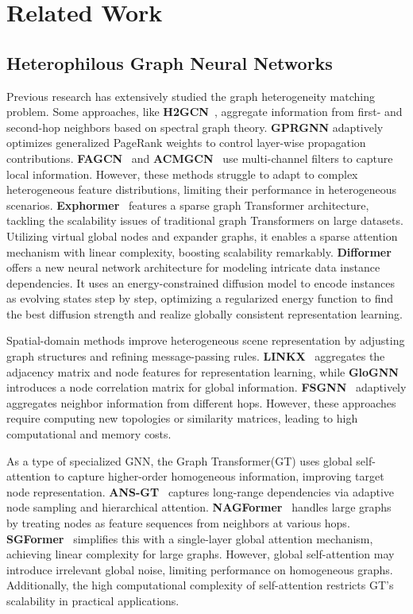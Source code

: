 \section{Related Work}
\subsection{Heterophilous Graph Neural Networks}  
Previous research has extensively studied the graph heterogeneity matching problem. Some approaches, like \textbf{H2GCN}~\cite{H2GCN2020}, aggregate information from first- and second-hop neighbors based on spectral graph theory. \textbf{GPRGNN} adaptively optimizes generalized PageRank weights to control layer-wise propagation contributions. \textbf{FAGCN}~\cite{fagcn2021} and \textbf{ACMGCN}~\cite{luan2022revisiting} use multi-channel filters to capture local information. However, these methods struggle to adapt to complex heterogeneous feature distributions, limiting their performance in heterogeneous scenarios. \textbf{Exphormer}~\cite{exphormer} features a sparse graph Transformer architecture, tackling the scalability issues of traditional graph Transformers on large datasets.  Utilizing virtual global nodes and expander graphs, it enables a sparse attention mechanism with linear complexity, boosting scalability remarkably.
\textbf{Difformer}~\cite{wu2023difformer} offers a new neural network architecture for modeling intricate data instance dependencies.  It uses an energy-constrained diffusion model to encode instances as evolving states step by step, optimizing a regularized energy function to find the best diffusion strength and realize globally consistent representation learning.

Spatial-domain methods improve heterogeneous scene representation by adjusting graph structures and refining message-passing rules. \textbf{LINKX}~\cite{NEURIPS2021_ae816a80} aggregates the adjacency matrix and node features for representation learning, while \textbf{GloGNN}~\cite{li2022finding} introduces a node correlation matrix for global information. \textbf{FSGNN}~\cite{MAURYA2022101695} adaptively aggregates neighbor information from different hops. However, these approaches require computing new topologies or similarity matrices, leading to high computational and memory costs. 

As a type of specialized GNN, the Graph Transformer(GT) uses global self-attention to capture higher-order homogeneous information, improving target node representation. \textbf{ANS-GT}~\cite{ASN-GT} captures long-range dependencies via adaptive node sampling and hierarchical attention. \textbf{NAGFormer}~\cite{NAGphormer} handles large graphs by treating nodes as feature sequences from neighbors at various hops. \textbf{SGFormer}~\cite{SGFormer} simplifies this with a single-layer global attention mechanism, achieving linear complexity for large graphs. However, global self-attention may introduce irrelevant global noise, limiting performance on homogeneous graphs. Additionally, the high computational complexity of self-attention restricts GT’s scalability in practical applications.


